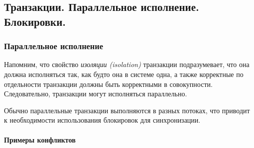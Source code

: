 \subsection{Транзакции. Параллельное исполнение. Блокировки.}

\subsubsection{Параллельное исполнение}

Напомним, что свойство \textit{изоляции (isolation)} транзакции подразумевает, что она должна исполняться
так, как будто она в системе одна, а также корректные по отдельности транзакции должны быть
корректными в совокупности. Следовательно, транзакции могут исполняться параллельно.

Обычно параллельные транзакции выполняются в разных потоках, что приводит к необходимости
использования блокировок для синхронизации.

\paragraph{Примеры конфликтов}

